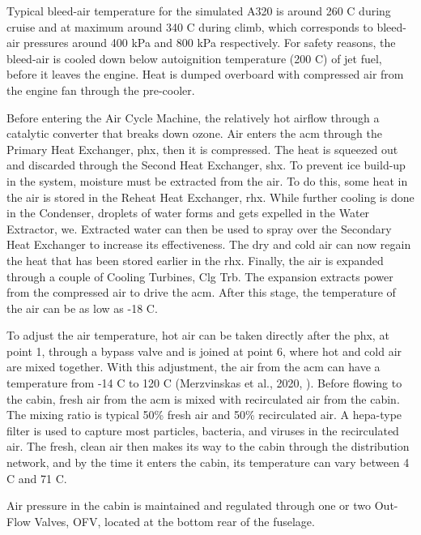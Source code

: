 \documentclass[english]{kththesis}
\begin{document}
Typical bleed-air temperature for the simulated A320 is around 260 \degree C during cruise and at maximum around 340 \degree C during climb, which corresponds to bleed-air pressures around 400 kPa and 800 kPa respectively. For safety reasons, the bleed-air is cooled down below autoignition temperature (200 \degree C) of jet fuel, before it leaves the engine. Heat is dumped overboard with compressed air from the engine fan through the pre-cooler.

Before entering the Air Cycle Machine, the relatively hot airflow through a catalytic converter that breaks down ozone. Air enters the \acrshort{acm} through the Primary Heat Exchanger, \acrshort{phx}, then it is compressed. The heat is squeezed out and discarded through the Second Heat Exchanger, \acrshort{shx}. To prevent ice build-up in the system, moisture must be extracted from the air. To do this, some heat in the air is stored in the Reheat Heat Exchanger, \acrshort{rhx}. While further cooling is done in the Condenser, droplets of water forms and gets expelled in the Water Extractor, \acrshort{we}. Extracted water can then be used to spray over the Secondary Heat Exchanger to increase its effectiveness. The dry and cold air can now regain the heat that has been stored earlier in the \acrshort{rhx}. Finally, the air is expanded through a couple of Cooling Turbines, Clg Trb. The expansion extracts power from the compressed air to drive the \acrshort{acm}. After this stage, the temperature of the air can be as low as -18 \degree C.

To adjust the air temperature, hot air can be taken directly after the \acrshort{phx}, at point 1, through a bypass valve and is joined at point 6, where hot and cold air are mixed together. With this adjustment, the air from the \acrshort{acm} can have a temperature from -14 \degree C to 120 \degree C (Merzvinskas et al., 2020, \cite{Merzvinskas2020}). Before flowing to the cabin, fresh air from the \acrshort{acm} is mixed with recirculated air from the cabin. The mixing ratio is typical 50\% fresh air and 50\% recirculated air. A \acrshort{hepa}-type filter is used to capture most particles, bacteria, and viruses in the recirculated air. The fresh, clean air then makes its way to the cabin through the distribution network, and by the time it enters the cabin, its temperature can vary between 4 \degree C and 71 \degree C.

Air pressure in the cabin is maintained and regulated through one or two Out-Flow Valves, OFV, located at the bottom rear of the fuselage.
\end{document}
